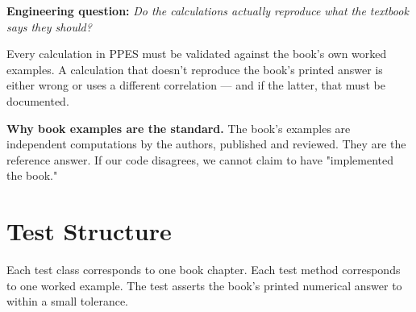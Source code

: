 \documentclass[11pt,a4paper,openany]{book}
\begin{document}
\begin{purpose}
\textbf{Engineering question:} \emph{Do the calculations actually
reproduce what the textbook says they should?}

Every calculation in PPES must be validated against the book's own
worked examples. A calculation that doesn't reproduce the book's
printed answer is either wrong or uses a different correlation — and
if the latter, that must be documented.
\end{purpose}

\begin{theory}
\textbf{Why book examples are the standard.} The book's examples
are independent computations by the authors, published and reviewed.
They are the reference answer. If our code disagrees, we cannot claim
to have "implemented the book."
\end{theory}

\section{Test Structure}

\begin{theory}
Each test class corresponds to one book chapter. Each test method
corresponds to one worked example. The test asserts the book's
printed numerical answer to within a small tolerance.
\end{theory}
\end{document}
